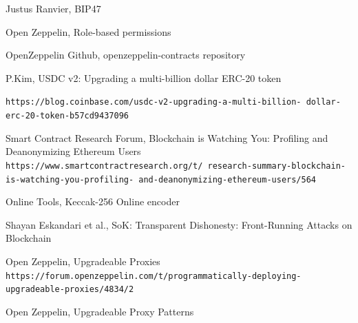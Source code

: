 \documentclass[12pt]{article}
\begin{document}
\begin{thebibliography}{3}



Justus Ranvier, BIP47
\\\texttt{}



Open Zeppelin, Role-based permissions
\\\texttt{}



OpenZeppelin Github, openzeppelin-contracts  repository

\texttt{}



P.Kim, USDC v2: Upgrading a multi-billion dollar ERC-20 token

\texttt{https://blog.coinbase.com/usdc-v2-upgrading-a-multi-billion-
dollar-erc-20-token-b57cd9437096}



Smart Contract Research Forum, Blockchain is Watching You: Profiling and Deanonymizing Ethereum Users
\\\texttt{https://www.smartcontractresearch.org/t/ research-summary-blockchain-is-watching-you-profiling- and-deanonymizing-ethereum-users/564}

Online Tools, Keccak-256 Online encoder

\texttt{}

Shayan Eskandari et al., SoK: Transparent Dishonesty:
Front-Running Attacks on Blockchain

\texttt{}


Open Zeppelin, Upgradeable Proxies
\\\texttt{https://forum.openzeppelin.com/t/programmatically-deploying- upgradeable-proxies/4834/2}



Open Zeppelin, Upgradeable Proxy Patterns
\\\texttt{}





\end{thebibliography}


\pagebreak
\tableofcontents



\end{document}
